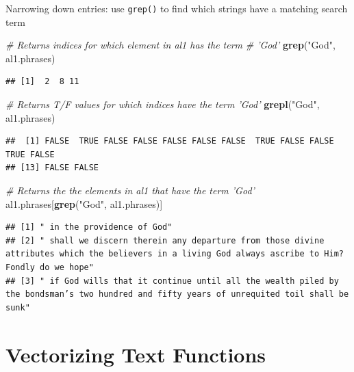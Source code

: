 \documentclass[
]{book}
\newenvironment{Shaded}{\begin{snugshade}}{\end{snugshade}}
\newcommand{\CommentTok}[1]{\textcolor[rgb]{0.56,0.35,0.01}{\textit{#1}}}
\newcommand{\KeywordTok}[1]{\textcolor[rgb]{0.13,0.29,0.53}{\textbf{#1}}}
\newcommand{\NormalTok}[1]{#1}
\newcommand{\StringTok}[1]{\textcolor[rgb]{0.31,0.60,0.02}{#1}}
\begin{document}
Narrowing down entries: use \texttt{grep()} to find which strings have a matching search term

\begin{Shaded}
\begin{Highlighting}[]
\CommentTok{# Returns indices for which element in al1 has the term}
\CommentTok{# 'God'}
\KeywordTok{grep}\NormalTok{(}\StringTok{"God"}\NormalTok{, al1.phrases)}
\end{Highlighting}
\end{Shaded}

\begin{verbatim}
## [1]  2  8 11
\end{verbatim}

\begin{Shaded}
\begin{Highlighting}[]
\CommentTok{# Returns T/F values for which indices have the term 'God'}
\KeywordTok{grepl}\NormalTok{(}\StringTok{"God"}\NormalTok{, al1.phrases)}
\end{Highlighting}
\end{Shaded}

\begin{verbatim}
##  [1] FALSE  TRUE FALSE FALSE FALSE FALSE FALSE  TRUE FALSE FALSE  TRUE FALSE
## [13] FALSE FALSE
\end{verbatim}

\begin{Shaded}
\begin{Highlighting}[]
\CommentTok{# Returns the the elements in al1 that have the term 'God'}
\NormalTok{al1.phrases[}\KeywordTok{grep}\NormalTok{(}\StringTok{"God"}\NormalTok{, al1.phrases)]}
\end{Highlighting}
\end{Shaded}

\begin{verbatim}
## [1] " in the providence of God"                                                                                                                        
## [2] " shall we discern therein any departure from those divine attributes which the believers in a living God always ascribe to Him? Fondly do we hope"
## [3] " if God wills that it continue until all the wealth piled by the bondsman’s two hundred and fifty years of unrequited toil shall be sunk"
\end{verbatim}

\hypertarget{vectorizing-text-functions}{%
\section{Vectorizing Text Functions}\label{vectorizing-text-functions}}
\end{document}

